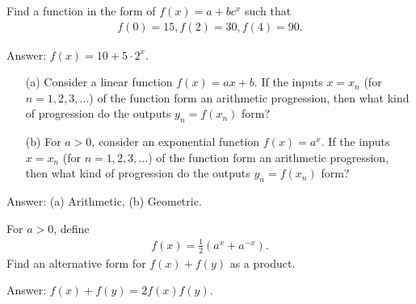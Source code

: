 \documentclass[12pt,a4paper]{memoir}
\theoremstyle{definition}
\begin{document}
\begin{tcolorbox}
	\begin{question}
		Find a function in the form of $f(x)=a+bc^x$ such that
		\begin{align*}
			f(0)=15, f(2)=30, f(4)=90.
		\end{align*}
	\end{question}
\end{tcolorbox}

\begin{solution}[name=Solution by Parviz Shahriari]
	Answer: $f(x) = 10 + 5 \cdot 2^x$.
\end{solution}

\begin{tcolorbox}
	\begin{question}
		\begin{itemize}
			\item[(a)] Consider a linear function $f(x)=ax+b$. If the inputs $x=x_n$ (for $n=1,2,3,\dots$) of the function form an arithmetic progression, then what kind of progression do the outputs $y_n=f(x_n)$ form?
			\item[(b)] For $a>0$, consider an exponential function $f(x)=a^x$. If the inputs $x=x_n$ (for $n=1,2,3,\dots$) of the function form an arithmetic progression, then what kind of progression do the outputs $y_n=f(x_n)$ form?
		\end{itemize}
	\end{question}
\end{tcolorbox}

\begin{solution}[name=Solution by Parviz Shahriari]
	Answer: (a) Arithmetic, (b) Geometric.
\end{solution}




\begin{tcolorbox}
	\begin{question}
		For $a>0$, define
		\begin{align*}
			f(x)= \frac{1}{2}\left(a^{x}+a^{-x}\right).
		\end{align*}
		Find an alternative form for $f(x)+f(y)$ as a product.
	\end{question}
\end{tcolorbox}

\begin{solution}[name=Solution by Parviz Shahriari]
	Answer: $f(x)+f(y) = 2f(x)f(y)$.
\end{solution}
\end{document}
